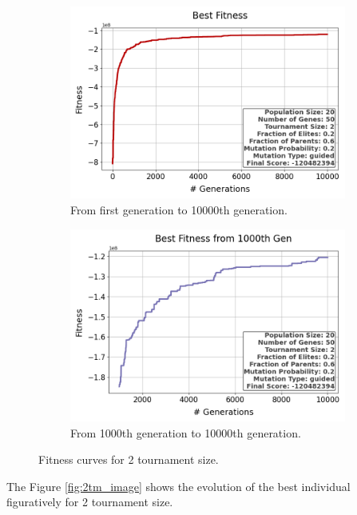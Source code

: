 \documentclass{assignment}
\begin{document}
\begin{figure}[H]
    \begin{subfigure}{0.5\textwidth}
        \includegraphics[width=\textwidth]{figures/best_fitness_output_20_50_2_0.2_0.6_0.2_guided.png}
        \caption{From first generation to 10000th generation.}
    \end{subfigure}\hfill
    \begin{subfigure}{0.5\textwidth}
        \includegraphics[width=\textwidth]{figures/best_fitness_1000_output_20_50_2_0.2_0.6_0.2_guided.png}
        \caption{From 1000th generation to 10000th generation.}
    \end{subfigure}
    \caption{Fitness curves for 2 tournament size.}
\label{fig:2tm}
\end{figure}

The Figure \ref{fig:2tm_image} shows the evolution of the best individual figuratively for 2 tournament size.
\end{document}
